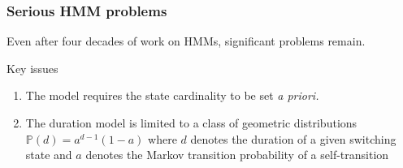 \documentclass[aspectratio=169]{beamer}
\begin{document}
    \begin{frame}
        \frametitle{Serious HMM problems}

        Even after four decades of work on HMMs, significant problems remain.

        \begin{block}{Key issues}
            \begin{enumerate}
                \item The model requires the state cardinality to be set \textit{a priori.}
                \item The duration model is limited to a class of geometric distributions $\mathbb{P}(d) = a^{d-1} (1-a)$ where $d$ denotes the duration of a given switching state and $a$ denotes the Markov transition probability of a self-transition
            \end{enumerate}
        \end{block}

    \end{frame}
\end{document}
